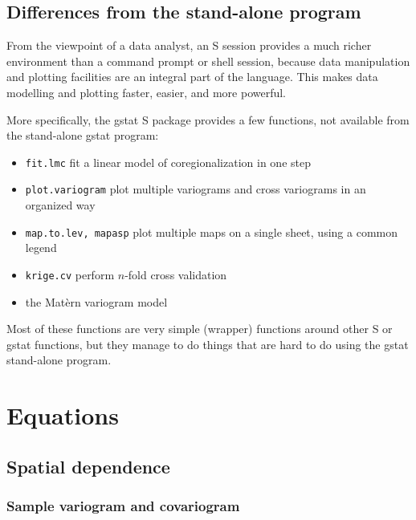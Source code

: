 \documentclass[a4paper,12pt]{book}
\begin{document}
\section{Differences from the stand-alone program}

From the viewpoint of a data analyst, an S session provides a much
richer environment than a command prompt or shell session, because data
manipulation and plotting facilities are an integral part of the language.
This makes data modelling and plotting faster, easier, and more powerful.

More specifically, the gstat S package provides a few functions, not
available from the stand-alone gstat program:
\begin{itemize}
\item {\tt fit.lmc} fit a linear model of coregionalization in one step
\item {\tt plot.variogram} plot multiple variograms and cross variograms
in an organized way
\item {\tt map.to.lev, mapasp} plot multiple maps on a single sheet,
using a common legend
\item {\tt krige.cv} perform $n$-fold cross validation
\item the Mat\`{e}rn variogram model
\end{itemize}
Most of these functions are very simple (wrapper) functions around other
S or gstat functions, but they manage to do things that are hard to do
using the gstat stand-alone program.

\appendix

\chapter{Equations}
\label{app:eqs.main}

\section{Spatial dependence}
\label{app:sample}

\subsection*{Sample variogram and covariogram}
\end{document}

